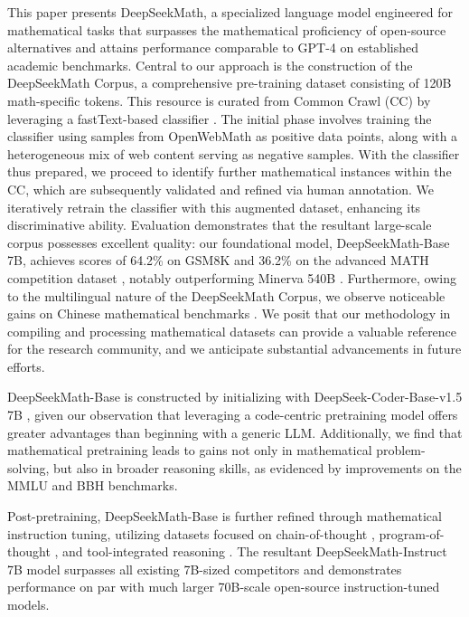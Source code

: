 This paper presents DeepSeekMath, a specialized language model engineered for mathematical tasks that surpasses the mathematical proficiency of open-source alternatives and attains performance comparable to GPT-4 on established academic benchmarks. Central to our approach is the construction of the DeepSeekMath Corpus, a comprehensive pre-training dataset consisting of 120B math-specific tokens. This resource is curated from Common Crawl (CC) by leveraging a fastText-based classifier \citep{joulin2016fasttext}. The initial phase involves training the classifier using samples from OpenWebMath \citep{openwebmath} as positive data points, along with a heterogeneous mix of web content serving as negative samples. With the classifier thus prepared, we proceed to identify further mathematical instances within the CC, which are subsequently validated and refined via human annotation. We iteratively retrain the classifier with this augmented dataset, enhancing its discriminative ability. Evaluation demonstrates that the resultant large-scale corpus possesses excellent quality: our foundational model, DeepSeekMath-Base 7B, achieves scores of 64.2\% on GSM8K \citep{gsm8k} and 36.2\% on the advanced MATH competition dataset \citep{MATH}, notably outperforming Minerva 540B \citep{minerva}. Furthermore, owing to the multilingual nature of the DeepSeekMath Corpus, we observe noticeable gains on Chinese mathematical benchmarks \citep{wei2023cmath,agieval}. We posit that our methodology in compiling and processing mathematical datasets can provide a valuable reference for the research community, and we anticipate substantial advancements in future efforts.

DeepSeekMath-Base is constructed by initializing with DeepSeek-Coder-Base-v1.5 7B \citep{deepseek-coder}, given our observation that leveraging a code-centric pretraining model offers greater advantages than beginning with a generic LLM. Additionally, we find that mathematical pretraining leads to gains not only in mathematical problem-solving, but also in broader reasoning skills, as evidenced by improvements on the MMLU \citep{mmlu} and BBH \citep{bbh} benchmarks.

Post-pretraining, DeepSeekMath-Base is further refined through mathematical instruction tuning, utilizing datasets focused on chain-of-thought \citep{cot}, program-of-thought \citep{pot,pal}, and tool-integrated reasoning \citep{tora}. The resultant DeepSeekMath-Instruct 7B model surpasses all existing 7B-sized competitors and demonstrates performance on par with much larger 70B-scale open-source instruction-tuned models.


